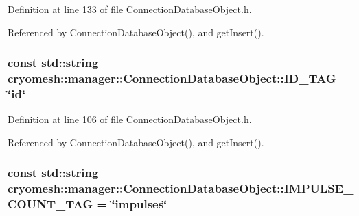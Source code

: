 \-Definition at line 133 of file \-Connection\-Database\-Object.\-h.



\-Referenced by \-Connection\-Database\-Object(), and get\-Insert().

\hypertarget{classcryomesh_1_1manager_1_1ConnectionDatabaseObject_ad04bc9639dd0ceed8d559f63cdc0c025}{
\subsubsection[{\-I\-D\-\_\-\-T\-A\-G}]{\setlength{\rightskip}{0pt plus 5cm}const std\-::string {\bf cryomesh\-::manager\-::\-Connection\-Database\-Object\-::\-I\-D\-\_\-\-T\-A\-G} = \char`\"{}id\char`\"{}}}\label{classcryomesh_1_1manager_1_1ConnectionDatabaseObject_ad04bc9639dd0ceed8d559f63cdc0c025}


\-Definition at line 106 of file \-Connection\-Database\-Object.\-h.



\-Referenced by \-Connection\-Database\-Object(), and get\-Insert().

\hypertarget{classcryomesh_1_1manager_1_1ConnectionDatabaseObject_a5e1505fdea7990278b9055b87d1071ef}{
\subsubsection[{\-I\-M\-P\-U\-L\-S\-E\-\_\-\-C\-O\-U\-N\-T\-\_\-\-T\-A\-G}]{\setlength{\rightskip}{0pt plus 5cm}const std\-::string {\bf cryomesh\-::manager\-::\-Connection\-Database\-Object\-::\-I\-M\-P\-U\-L\-S\-E\-\_\-\-C\-O\-U\-N\-T\-\_\-\-T\-A\-G} = \char`\"{}impulses\char`\"{}}}\label{classcryomesh_1_1manager_1_1ConnectionDatabaseObject_a5e1505fdea7990278b9055b87d1071ef}


